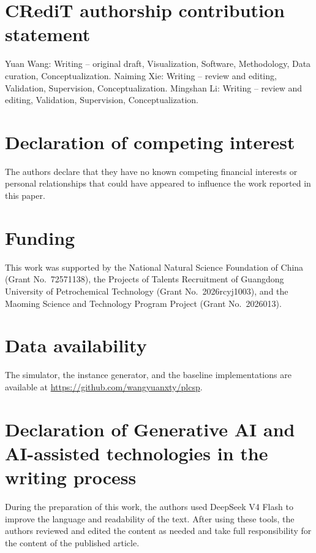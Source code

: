 \section*{CRediT authorship contribution statement}

Yuan Wang: Writing -- original draft, Visualization, Software,
Methodology, Data curation, Conceptualization. Naiming Xie: Writing --
review and editing, Validation, Supervision, Conceptualization. Mingshan
Li: Writing -- review and editing, Validation, Supervision,
Conceptualization.

\section*{Declaration of competing interest}

The authors declare that they have no known competing financial interests
or personal relationships that could have appeared to influence the work
reported in this paper.

\section*{Funding}

This work was supported by the National Natural Science Foundation of China
(Grant No.~72571138), the Projects of Talents Recruitment of Guangdong
University of Petrochemical Technology (Grant No.~2026rcyj1003), and the
Maoming Science and Technology Program Project (Grant No.~2026013).

\section*{Data availability}

The simulator, the instance generator, and the baseline implementations are
available at \url{https://github.com/wangyuanxty/plcsp}.

\section*{Declaration of Generative AI and AI-assisted technologies in the writing process}

During the preparation of this work, the authors used DeepSeek V4 Flash to
improve the language and readability of the text. After using these tools, the
authors reviewed and edited the content as needed and take full responsibility
for the content of the published article.
\fi
